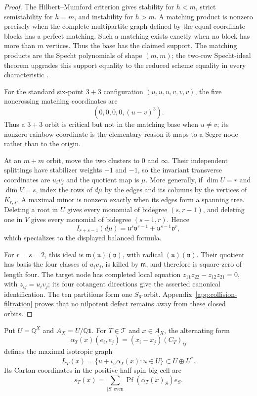 \documentclass[11pt]{article}
\theoremstyle{definition}
\theoremstyle{remark}
\newcommand{\cT}{\mathcal T}
\newcommand{\Pf}{\operatorname{Pf}}
\begin{document}
\begin{proof}
The Hilbert--Mumford criterion gives stability for \(h<m\), strict
semistability for \(h=m\), and instability for \(h>m\).  A matching product
is nonzero precisely when the complete multipartite graph defined by the
equal-coordinate blocks has a perfect matching.  Such a matching exists
exactly when no block has more than \(m\) vertices.  Thus the base has the
claimed support.  The matching products are the Specht polynomials of shape
\((m,m)\); the two-row Specht-ideal theorem upgrades this support equality
to the reduced scheme equality in every characteristic
\cite{McDanielWatanabe}.

For the standard six-point \(3+3\) configuration
\((u,u,u,v,v,v)\), the five noncrossing matching coordinates are
\[
 (0,0,0,0,(u-v)^3).
\]
Thus a \(3+3\) orbit is critical but not in the matching base when
\(u\ne v\); its nonzero rainbow coordinate is the elementary reason it maps
to a Segre node rather than to the origin.

At an \(m+m\) orbit, move the two clusters to \(0\) and \(\infty\).  Their
independent splittings have stabilizer weights \(+1\) and \(-1\), so the
invariant transverse coordinates are \(u_iv_j\) and the quotient map is
\(\mu\).  More generally, if \(\dim U=r\) and \(\dim V=s\), index the rows
of \(d\mu\) by the edges and its columns by the vertices of \(K_{r,s}\).
A maximal minor is nonzero exactly when its edges form a spanning tree.
Deleting a root in \(U\) gives every monomial of bidegree \((s,r-1)\), and
deleting one in \(V\) gives every monomial of bidegree \((s-1,r)\).  Hence
\[
 I_{r+s-1}(d\mu)
 =\mathfrak u^s\mathfrak v^{r-1}
  +\mathfrak u^{s-1}\mathfrak v^r,
\]
which specializes to the displayed balanced formula.

For \(r=s=2\), this ideal is
\(\mathfrak m(\mathfrak u)(\mathfrak v)\), with radical
\((\mathfrak u)(\mathfrak v)\).  Their quotient has basis the four classes
of \(u_iv_j\), is killed by \(\mathfrak m\), and therefore is square-zero
of length four.  The target node has completed local equation
\(z_{11}z_{22}-z_{12}z_{21}=0\), with \(z_{ij}=u_iv_j\); its four cotangent
directions give the asserted canonical identification.  The ten partitions
form one \(S_6\)-orbit.  Appendix~\ref{app:collision-filtration} proves that
no nilpotent defect remains away from these closed orbits.
\end{proof}

Put \(U=\mathbb Q^X\) and \(A_X=U/\mathbb Q\mathbf1\).  For
\(T\in\cT\) and \(x\in A_X\), the alternating form
\[
 \alpha_T(x)(e_i,e_j)=(x_i-x_j)(C_T)_{ij}
\]
defines the maximal isotropic graph
\[
 L_T(x)=\{u+\iota_u\alpha_T(x):u\in U\}
 \subset U\oplus U^*.
\]
Its Cartan coordinates in the positive half-spin big cell are
\[
 s_T(x)=\sum_{|S|\ \mathrm{even}}
       \Pf(\alpha_T(x)_S)e_S.
\]
\end{document}
